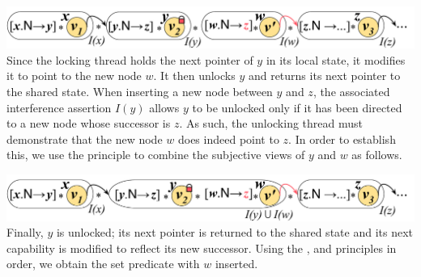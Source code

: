 %
{\centering \includegraphics[scale=0.25]{Sections/Examples/Images/add1.pdf}\\}
%
\noindent Since the locking thread holds the next pointer of $y$ in its local state, it modifies it to point to the new node $w$. It then unlocks $y$ and returns its next pointer to the shared state. When inserting a new node between $y$ and $z$, the associated interference assertion $I(y)$ allows $y$ to be unlocked only if it has been directed to a new node whose successor is $z$. As such, the unlocking thread must demonstrate that the new node $w$ does indeed point to $z$. In order to establish this, we use the \mergeRule principle to combine the subjective views of $y$ and $w$ as follows. \vspace{0pt}

%
{\centering \includegraphics[scale=0.25]{Sections/Examples/Images/add2.pdf}\\}
%
\noindent Finally, $y$ is unlocked; its next pointer is returned to the shared state and its next capability is modified to reflect its new successor. Using the \copyRule, \forgetRule and \shiftRule principles in order, we obtain the set predicate with $w$ inserted. \vspace{0pt}

